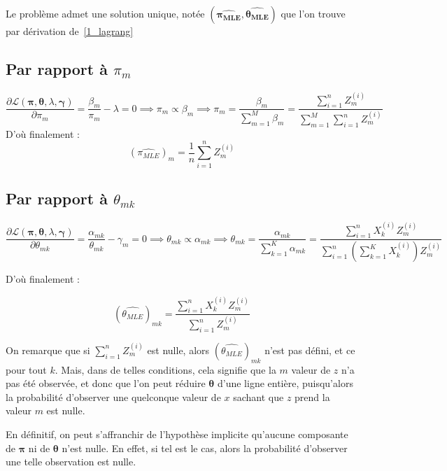 \documentclass[12pt,a4paper,onecolumn]{article}
\begin{document}
Le problème admet une solution unique, notée \( (\bm{\widehat{\pi_{MLE}}}, \bm{\widehat{\theta_{MLE}}}) \) que l'on trouve par dérivation de~\eqref{1_lagrang}

\subsection{Par rapport à \protect\(\pi_m\)}

\[
	\frac{\partial \mathcal{L}(\bm{\pi}, \bm{\theta}, \lambda, \bm{\gamma})}{\partial \pi_m} = \frac{\beta_m}{\pi_m} - \lambda = 0
	\implies \pi_m \propto \beta_m
	\implies \pi_m = \frac{\beta_m}{\sum_{m=1}^M \beta_m}= \frac{\sum_{i = 1}^n {Z_m^{(i)}}}{\sum_{m=1}^M \sum_{i = 1}^n {Z_m^{(i)}}}
\]
D'où finalement :
\begin{equation}
	\left(\widehat{\pi_{MLE}}\right)_m = \frac{1}{n} \sum_{i = 1}^n {Z_m^{(i)}}
	\label{1_pi}
\end{equation}

\subsection{Par rapport à \protect\(\theta_{mk}\)}

\[
	\frac{\partial \mathcal{L}(\bm{\pi}, \bm{\theta}, \lambda, \bm{\gamma})}{\partial \theta_{mk}} = \frac{\alpha_{mk}}{\theta_{mk}} - \gamma_m = 0 \implies \theta_{mk} \propto \alpha_{mk}
	\implies \theta_{mk} = \frac{\alpha_{mk}}{\sum_{k = 1}^K \alpha_{mk}} = \frac{\sum_{i = 1}^n X_k^{(i)} Z_m^{(i)}}{\sum_{i = 1}^n \left(\sum_{k=1}^K X_k^{(i)}\right) Z_m^{(i)}}
\]

D'où finalement :

\begin{equation}
	\left( \widehat{{\theta_{MLE}}} \right)_{mk} = \frac{\sum_{i = 1}^n X_k^{(i)} Z_m^{(i)}}{\sum_{i = 1}^n Z_m^{(i)}}
\end{equation}

On remarque que si \( \sum_{i = 1}^n Z_m^{(i)} \) est nulle, alors \( \left(\widehat{{\theta_{MLE}}}\right)_{mk} \) n'est pas défini, et ce pour tout \( k\). Mais, dans de telles conditions, cela signifie que la \( m \) valeur de \( z \) n'a pas été observée, et donc que l'on peut réduire \( \bm{\theta} \) d'une ligne entière, puisqu'alors la probabilité d'observer une quelconque valeur de \( x\) sachant que \( z\) prend la valeur \( m\) est nulle.

En définitif, on peut s'affranchir de l'hypothèse implicite qu'aucune composante de \(\bm{\pi}\) ni de \(\bm{\theta}\) n'est nulle. En effet, si tel est le cas, alors la probabilité d'observer une telle observation est nulle.
\end{document}
